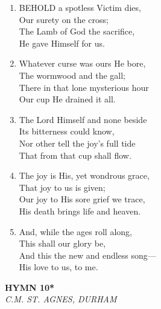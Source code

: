 \begin{enumerate}
    \item BEHOLD a spotless Victim dies, \\
        Our surety on the cross; \\
        The Lamb of God the sacrifice, \\
        He gave Himself for us.

    \item Whatever curse was ours He bore, \\
        The wormwood and the gall; \\
        There in that lone mysterious hour \\
        Our cup He drained it all.

    \item The Lord Himself and none beside \\
        Its bitterness could know, \\
        Nor other tell the joy's full tide \\
        That from that cup shall flow.

    \item The joy is His, yet wondrous grace, \\
        That joy to us is given; \\
        Our joy to His sore grief we trace, \\
        His death brings life and heaven.

    \item And, while the ages roll along, \\
        This shall our glory be, \\
        And this the new and endless song--- \\
        His love to us, to me.

\end{enumerate}

\newpage
\begin{center}
    {\Large \textbf{HYMN 10*}}
    \\
    \textit{C.M. ST. AGNES, DURHAM}
\end{center}
\vspace{1em}


